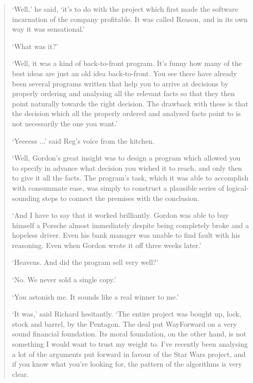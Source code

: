 %
%
%
%



\begin{quote}
`Well,' he said, `it's to do with the project which first made the
software incarnation of the company profitable. It was
called Reason, and in its own way it was sensational.'

`What was it?'

`Well, it was a kind of back-to-front program. It's funny how many of
the best ideas are just an old idea back-to-front. You
see there have already been several programs written that help you to
arrive at decisions by properly ordering and analysing
all the relevant facts so that they then point naturally towards the
right decision. The drawback with these is that the decision
which all the properly ordered and analysed facts point to is not
necessarily the one you want.'

`Yeeeess ...' said Reg's voice from the kitchen.

`Well, Gordon's great insight was to design a program which allowed
you to specify in advance what decision you wished it
to reach, and only then to give it all the facts. The program's
task, which it was able to accomplish with consummate ease,
was simply to construct a plausible series of logical-sounding steps
to connect the premises with the conclusion.

`And I have to say that it worked brilliantly. Gordon was able to buy
himself a Porsche almost immediately despite being
completely broke and a hopeless driver. Even his bank manager was
unable to find fault with his reasoning. Even when
Gordon wrote it off three weeks later.'

`Heavens. And did the program sell very well?'

`No. We never sold a single copy.'

`You astonish me. It sounds like a real winner to me.'

`It was,' said Richard hesitantly. `The entire project was bought
up, lock, stock and barrel, by the Pentagon. The deal put
WayForward on a very sound financial foundation. Its moral
foundation, on the other hand, is not something I would want to
trust my weight to. I've recently been analysing a lot of the
arguments put forward in favour of the Star Wars project, and if
you know what you're looking for, the pattern of the algorithms is
very clear.


\end{quote}
